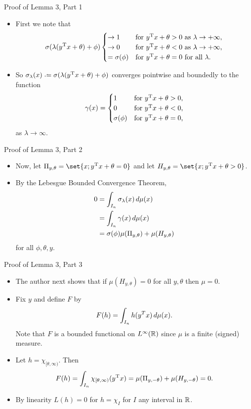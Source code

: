 \documentclass[11pt,letterpaper]{beamer}
\begin{document}
\begin{frame}{Proof of Lemma 3, Part 1}
  \begin{itemize}
  \item First we note that
    \[
      \sigma(\lambda( y^{\mathrm{T}} x+\theta)+\phi)
      \begin{cases}
        \to 1&\text{for $ y^{\mathrm{T}} x+\theta>0$ as $\lambda\to+\infty$,}\\
        \to 0&\text{for $ y^{\mathrm{T}} x+\theta<0$ as $\lambda\to+\infty$,}\\
        =\sigma(\phi)&\text{for $ y^{\mathrm{T}} x+\theta=0$ for all $\lambda$.}
      \end{cases}
    \]
  \item So $\sigma_\lambda( x)\bdef\sigma(\lambda( y^\rmT x+\theta)+\phi)$
    converges pointwise and boundedly to the function
    \[
      \gamma( x)=\begin{cases}
        1&\text{for $ y^{\mathrm{T}} x+\theta>0$,}\\
        0&\text{for $ y^{\mathrm{T}} x+\theta<0$,}\\
        \sigma(\phi)&\text{for $ y^{\mathrm{T}} x+\theta=0$,}
      \end{cases}
    \]
    as $\lambda\to\infty$.
\end{itemize}
\end{frame}

\begin{frame}{Proof of Lemma 3, Part 2}
  \begin{itemize}
  \item Now, let $\Pi_{ y,\theta}=\set{ x; y^\rmT x+\theta=0}$ and let $H_{
      y,\theta}=\set{ x; y^\rmT x+\theta>0}$.
  \item By the Lebesgue Bounded Convergence Theorem,
    \begin{align*}
      0&=\int_{I_n}\sigma_\lambda( x)\mathop{}\!d\mu( x)\\
       &=\int_{I_n}\gamma( x)\mathop{}\!d\mu( x)\\
       &=\sigma(\phi)\mu(\Pi_{ y,\theta})+\mu(H_{ y,\theta})
    \end{align*}
    for all $\phi,\theta, y$.
  \end{itemize}
\end{frame}

\begin{frame}{Proof of Lemma 3, Part 3}
  \begin{itemize}
  \item The author next shows that if $\mu(H_{ y,\theta})=0$ for all $ y,\theta$
    then $\mu=0$.
  \item Fix $y$ and define $F$ by
    \[
      F(h)=\int_{I_n} h( y^T x)\mathop{}\!d\mu(x).
    \]
    Note that $F$ is a bounded functional on $L^\infty(\mathbb{R})$ since $\mu$ is a
    finite (signed) measure.
  \item Let $h=\chi_{[\theta,\infty)}$. Then
    \[
      F(h)=\int_{I_n}\chi_{[\theta,\infty)}( y^{\mathrm{T}} x)= \mu(\Pi_{
        y,-\theta})+\mu(H_{ y,-\theta})=0.
    \]
  \item By linearity $L(h)=0$ for $h=\chi_{I}$ for $I$ any interval in $\mathbb{R}$.
\end{itemize}
\end{frame}
\end{document}
